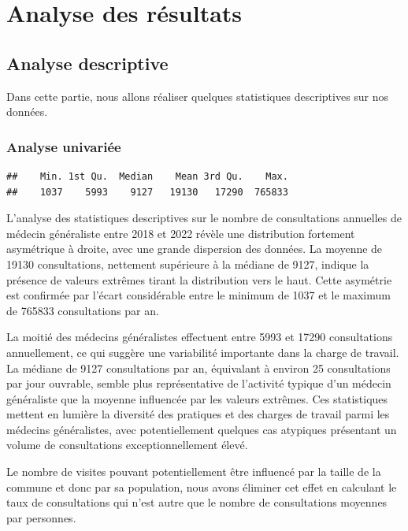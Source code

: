 \documentclass[
]{article}
\begin{document}
\section{Analyse des résultats}\label{analyse-des-ruxe9sultats}

\subsection{Analyse descriptive}\label{analyse-descriptive}

Dans cette partie, nous allons réaliser quelques statistiques
descriptives sur nos données.

\subsubsection{Analyse univariée}\label{analyse-univariuxe9e}

\begin{verbatim}
##    Min. 1st Qu.  Median    Mean 3rd Qu.    Max. 
##    1037    5993    9127   19130   17290  765833
\end{verbatim}

L'analyse des statistiques descriptives sur le nombre de consultations
annuelles de médecin généraliste entre 2018 et 2022 révèle une
distribution fortement asymétrique à droite, avec une grande dispersion
des données. La moyenne de 19130 consultations, nettement supérieure à
la médiane de 9127, indique la présence de valeurs extrêmes tirant la
distribution vers le haut. Cette asymétrie est confirmée par l'écart
considérable entre le minimum de 1037 et le maximum de 765833
consultations par an.

La moitié des médecins généralistes effectuent entre 5993 et 17290
consultations annuellement, ce qui suggère une variabilité importante
dans la charge de travail. La médiane de 9127 consultations par an,
équivalant à environ 25 consultations par jour ouvrable, semble plus
représentative de l'activité typique d'un médecin généraliste que la
moyenne influencée par les valeurs extrêmes. Ces statistiques mettent en
lumière la diversité des pratiques et des charges de travail parmi les
médecins généralistes, avec potentiellement quelques cas atypiques
présentant un volume de consultations exceptionnellement élevé.

Le nombre de visites pouvant potentiellement être influencé par la
taille de la commune et donc par sa population, nous avons éliminer cet
effet en calculant le taux de consultations qui n'est autre que le
nombre de consultations moyennes par personnes.
\end{document}

